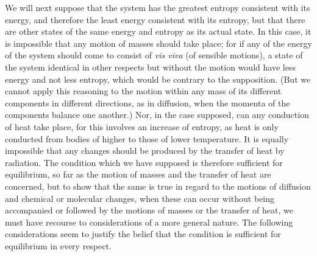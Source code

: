 \documentclass[12pt]{article}
\begin{document}
We will next suppose that the system has the greatest entropy consistent with its energy, and therefore the least energy consistent with its entropy, but that there are other states of the same energy and entropy as its actual state. In this case, it is impossible that any motion of masses should take place; for if any of the energy of the system should come to consist of \textit{vis viva} (of sensible motions), a state of the system identical in other respects but without the motion would have less energy and not less entropy, which would be contrary to the supposition. (But we cannot apply this reasoning to the motion within any mass of its different components in different directions, as in diffusion, when the momenta of the components balance one another.) Nor, in the case supposed, can any conduction of heat take place, for this involves an increase of entropy, as heat is only conducted from bodies of higher to those of lower temperature. It is equally impossible that any changes should be produced by the transfer of heat by radiation. The condition which we have supposed is therefore sufficient for equilibrium, so far as the motion of masses and the transfer of heat are concerned, but to show that the same is true in regard to the motions of diffusion and chemical or molecular changes, when these can occur without being accompanied or followed by the motions of masses or the transfer of heat, we must have recourse to considerations of a more general nature. The following considerations seem to justify the belief that the condition is sufficient for equilibrium in every respect.
\end{document}
